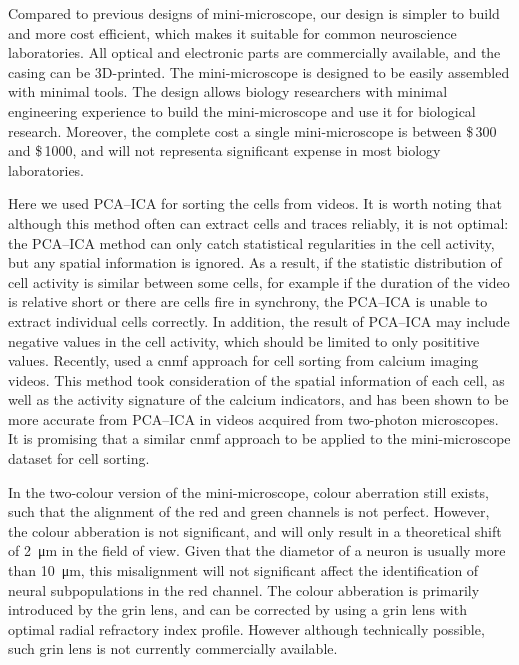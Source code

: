 Compared to previous designs of mini-microscope, our design is simpler to build and more cost efficient, which makes it suitable for common neuroscience laboratories. All optical and electronic parts are commercially available, and the casing can be 3D-printed. The mini-microscope is designed to be easily assembled with minimal tools. The design allows biology researchers with minimal engineering experience to build the mini-microscope and use it for biological research. Moreover, the complete cost a single mini-microscope is between \$\,300 and \$\,1000, and will not representa significant expense in most biology laboratories.

Here we used PCA--ICA for sorting the cells from videos. It is worth noting that although this method often can extract cells and traces reliably, it is not optimal: the PCA--ICA method can only catch statistical regularities in the cell activity, but any spatial information is ignored. As a result, if the statistic distribution of cell activity is similar between some cells, for example if the duration of the video is relative short or there are cells fire in synchrony, the PCA--ICA is unable to extract individual cells correctly. In addition, the result of PCA--ICA may include negative values in the cell activity, which should be limited to only posititive values. Recently, \citet{pnevmatikakis16} used a \gls{cnmf} approach for cell sorting from calcium imaging videos. This method took consideration of the spatial information of each cell, as well as the activity signature of the calcium indicators, and has been shown to be more accurate from PCA--ICA in videos acquired from two-photon microscopes. It is promising that a similar \gls{cnmf} approach to be applied to the mini-microscope dataset for cell sorting. 

In the two-colour version of the mini-microscope, colour aberration still exists, such that the alignment of the red and green channels is not perfect. However, the colour abberation is not significant, and will only result in a theoretical shift of \SI{2}{\um} in the field of view. Given that the diametor of a neuron is usually more than \SI{10}{\um}, this misalignment will not significant affect the identification of neural subpopulations in the red channel. The colour abberation is primarily introduced by the \gls{grin} lens, and can be corrected by using a \gls{grin} lens with optimal radial refractory index profile. However although technically possible, such \gls{grin} lens is not currently commercially available. 



